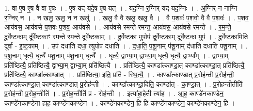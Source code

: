 \documentclass[17pt]{extarticle}
\begin{document}
1. वा ए॒ष ए॒ष वै वा ए॒षः । . ए॒ष यद् यदे॒ष ए॒ष यत् । . यद॒ग्नि र॒ग्निर् यद् यद॒ग्निः । . अ॒ग्निर् न नाग्नि र॒ग्निर् न । . न खलु॒ खलु॒ न न खलु॑ । . खलु॒ वै वै खलु॒ खलु॒ वै । . वै प॒शवः॑ प॒शवो॒ वै वै प॒शवः॑ । . प॒शव॒ आय॑वस॒ आय॑वसे प॒शवः॑ प॒शव॒ आय॑वसे । . आय॑वसे रमन्ते रमन्त॒ आय॑वस॒ आय॑वसे रमन्ते । . र॒म॒न्ते॒ दू॒र्वे॒ष्ट॒काम् दू᳚र्वेष्ट॒काꣳ र॑मन्ते रमन्ते दूर्वेष्ट॒काम् । . दू॒र्वे॒ष्ट॒का मुपोप॑ दूर्वेष्ट॒काम् दू᳚र्वेष्ट॒का मुप॑ । . दू॒र्वे॒ष्ट॒कामिति॑ दूर्वा - इ॒ष्ट॒काम् । . उप॑ दधाति दधा॒ त्युपोप॑ दधाति । . द॒धा॒ति॒ प॒शू॒नाम् प॑शू॒नाम् द॑धाति दधाति पशू॒नाम् । . प॒शू॒नाम् धृत्यै॒ धृत्यै॑ पशू॒नाम् प॑शू॒नाम् धृत्यै᳚ । . धृत्यै॒ द्वाभ्या॒म् द्वाभ्या॒म् धृत्यै॒ धृत्यै॒ द्वाभ्या᳚म् । . द्वाभ्या॒म् प्रति॑ष्ठित्यै॒ प्रति॑ष्ठित्यै॒ द्वाभ्या॒म् द्वाभ्या॒म् प्रति॑ष्ठित्यै । . प्रति॑ष्ठित्यै॒ काण्डा᳚त्काण्डा॒त् काण्डा᳚त्काण्डा॒त् प्रति॑ष्ठित्यै॒ प्रति॑ष्ठित्यै॒ काण्डा᳚त्काण्डात् । . प्रति॑ष्ठित्या॒ इति॒ प्रति॑ - स्थि॒त्यै॒ । . काण्डा᳚त्काण्डात् प्र॒रोह॑न्ती प्र॒रोह॑न्ती॒ काण्डा᳚त्काण्डा॒त् काण्डा᳚त्काण्डात् प्र॒रोह॑न्ती । . काण्डा᳚त्काण्डा॒दिति॒ काण्डा᳚त् - का॒ण्डा॒त् । . प्र॒रोह॒न्तीतीति॑ प्र॒रोह॑न्ती प्र॒रोह॒न्तीति॑ । . प्र॒रोह॒न्तीति॑ प्र - रोह॑न्ती । . इत्या॑हा॒हेती त्या॑ह । . आ॒ह॒ काण्डे॑नकाण्डेन॒ काण्डे॑नकाण्डेना हाह॒ काण्डे॑नकाण्डेन । . काण्डे॑नकाण्डेन॒ हि हि काण्डे॑नकाण्डेन॒ काण्डे॑नकाण्डेन॒ हि । \newline
\end{document}
